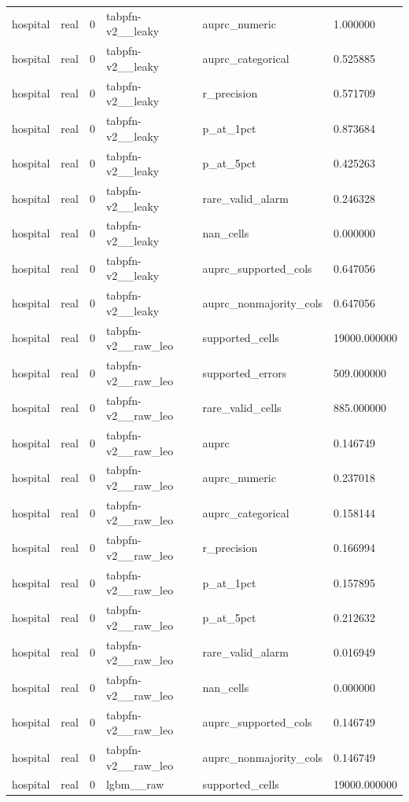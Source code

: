 \begin{tabular}{llllll}
hospital & real & 0 & tabpfn-v2\_\_leaky & auprc\_numeric & 1.000000 \\
hospital & real & 0 & tabpfn-v2\_\_leaky & auprc\_categorical & 0.525885 \\
hospital & real & 0 & tabpfn-v2\_\_leaky & r\_precision & 0.571709 \\
hospital & real & 0 & tabpfn-v2\_\_leaky & p\_at\_1pct & 0.873684 \\
hospital & real & 0 & tabpfn-v2\_\_leaky & p\_at\_5pct & 0.425263 \\
hospital & real & 0 & tabpfn-v2\_\_leaky & rare\_valid\_alarm & 0.246328 \\
hospital & real & 0 & tabpfn-v2\_\_leaky & nan\_cells & 0.000000 \\
hospital & real & 0 & tabpfn-v2\_\_leaky & auprc\_supported\_cols & 0.647056 \\
hospital & real & 0 & tabpfn-v2\_\_leaky & auprc\_nonmajority\_cols & 0.647056 \\
hospital & real & 0 & tabpfn-v2\_\_raw\_leo & supported\_cells & 19000.000000 \\
hospital & real & 0 & tabpfn-v2\_\_raw\_leo & supported\_errors & 509.000000 \\
hospital & real & 0 & tabpfn-v2\_\_raw\_leo & rare\_valid\_cells & 885.000000 \\
hospital & real & 0 & tabpfn-v2\_\_raw\_leo & auprc & 0.146749 \\
hospital & real & 0 & tabpfn-v2\_\_raw\_leo & auprc\_numeric & 0.237018 \\
hospital & real & 0 & tabpfn-v2\_\_raw\_leo & auprc\_categorical & 0.158144 \\
hospital & real & 0 & tabpfn-v2\_\_raw\_leo & r\_precision & 0.166994 \\
hospital & real & 0 & tabpfn-v2\_\_raw\_leo & p\_at\_1pct & 0.157895 \\
hospital & real & 0 & tabpfn-v2\_\_raw\_leo & p\_at\_5pct & 0.212632 \\
hospital & real & 0 & tabpfn-v2\_\_raw\_leo & rare\_valid\_alarm & 0.016949 \\
hospital & real & 0 & tabpfn-v2\_\_raw\_leo & nan\_cells & 0.000000 \\
hospital & real & 0 & tabpfn-v2\_\_raw\_leo & auprc\_supported\_cols & 0.146749 \\
hospital & real & 0 & tabpfn-v2\_\_raw\_leo & auprc\_nonmajority\_cols & 0.146749 \\
hospital & real & 0 & lgbm\_\_raw & supported\_cells & 19000.000000 \\

\end{tabular}
